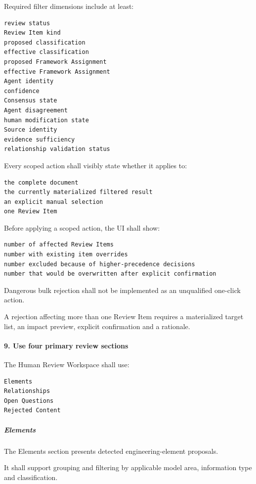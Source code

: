 Required filter dimensions include at least:

\begin{verbatim}
review status
Review Item kind
proposed classification
effective classification
proposed Framework Assignment
effective Framework Assignment
Agent identity
confidence
Consensus state
Agent disagreement
human modification state
Source identity
evidence sufficiency
relationship validation status
\end{verbatim}

Every scoped action shall visibly state whether it applies to:

\begin{verbatim}
the complete document
the currently materialized filtered result
an explicit manual selection
one Review Item
\end{verbatim}

Before applying a scoped action, the UI shall show:

\begin{verbatim}
number of affected Review Items
number with existing item overrides
number excluded because of higher-precedence decisions
number that would be overwritten after explicit confirmation
\end{verbatim}

Dangerous bulk rejection shall not be implemented as an unqualified one-click action.

A rejection affecting more than one Review Item requires a materialized target list, an impact preview, explicit confirmation and a rationale.

\hypertarget{9-use-four-primary-review-sections}{%
\paragraph{9. Use four primary review sections}\label{9-use-four-primary-review-sections}}

The Human Review Workspace shall use:

\begin{verbatim}
Elements
Relationships
Open Questions
Rejected Content
\end{verbatim}

\hypertarget{elements}{%
\subparagraph{Elements}\label{elements}}

The Elements section presents detected engineering-element proposals.

It shall support grouping and filtering by applicable model area, information type and classification.

